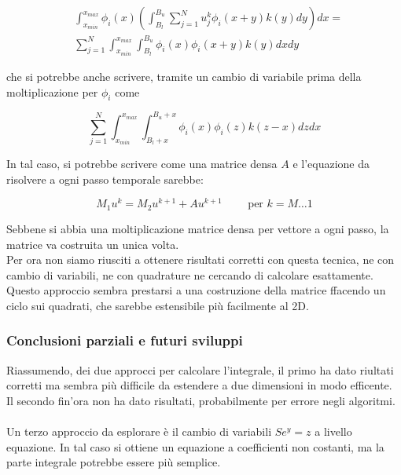 \documentclass[a4paper,10pt]{article}
\begin{document}
\begin{align*}
 & \int_{x_{min}}^{x_{max}}\phi_i(x)\left( \int_{B_l}^{B_u} \sum_{j=1}^N u_j^k \phi_i(x+y)k(y)dy \right)dx=\\ 
 &\sum_{j=1}^N  \int_{x_{min}}^{x_{max}}\int_{B_l}^{B_u} \phi_i(x)\phi_i(x+y)k(y)dxdy
\end{align*}

che si potrebbe anche scrivere, tramite un cambio di variabile prima della moltiplicazione per $\phi_i$ come

\begin{equation*}
 \sum_{j=1}^N  \int_{x_{min}}^{x_{max}}\int_{B_l+x}^{B_u+x} \phi_i(x)\phi_i(z)k(z-x)dzdx
\end{equation*}

In tal caso, si potrebbe scrivere come una matrice densa $A$ e l'equazione da risolvere a ogni passo temporale sarebbe:

\begin{equation*}
 M_1u^k=M_2u^{k+1}+Au^{k+1}  \qquad \text{ per } k=M\dots1
\end{equation*}

Sebbene si abbia una moltiplicazione matrice densa per vettore a ogni passo, la matrice va costruita un unica volta.\\
Per ora non siamo riusciti a ottenere risultati corretti con questa tecnica, ne con cambio di variabili, ne con quadrature ne cercando di calcolare esattamente. Questo approccio sembra prestarsi a una costruzione della matrice ffacendo un ciclo sui quadrati, che sarebbe estensibile più facilmente al 2D.

\subsubsection{Conclusioni parziali e futuri sviluppi}

Riassumendo, dei due approcci per calcolare l'integrale, il primo ha dato riultati corretti ma sembra più difficile da estendere a due dimensioni in modo efficente. Il secondo fin'ora non ha dato risultati, probabilmente per errore negli algoritmi.\\ \\
Un terzo approccio da esplorare è il cambio di variabili $Se^y=z$ a livello equazione. In tal caso si ottiene un equazione a coefficienti non costanti, ma la parte integrale potrebbe essere più semplice.
\end{document}
